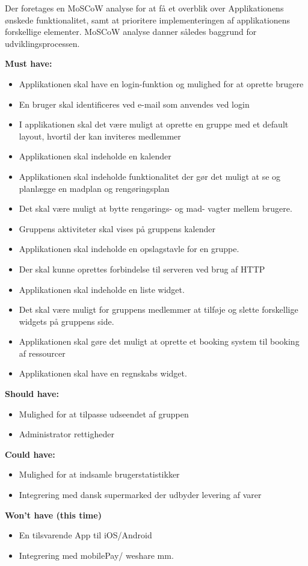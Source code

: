 Der foretages en MoSCoW analyse for at få et overblik over Applikationens ønskede funktionalitet, samt at prioritere implementeringen af applikationens forskellige elementer. MoSCoW analyse danner således baggrund for udviklingsprocessen.
\newline\newline

\noindent \textbf{Must have:}

\begin{itemize}
    \item Applikationen skal have en login-funktion og mulighed for at oprette brugere
    \item En bruger skal identificeres ved e-mail som anvendes ved login
    \item I applikationen skal det være muligt at oprette en gruppe med et default layout, hvortil der kan inviteres medlemmer
    \item Applikationen skal indeholde en kalender
    \item Applikationen skal indeholde funktionalitet der gør det muligt at se og planlægge en madplan og rengøringsplan
    \item Det skal være muligt at bytte rengørings- og mad- vagter mellem brugere. 
    \item Gruppens aktiviteter skal vises på gruppens kalender
    \item Applikationen skal indeholde en opslagstavle for en gruppe.
    \item Der skal kunne oprettes forbindelse til serveren ved brug af HTTP
    \item Applikationen skal indeholde en liste widget.
    \item Det skal være muligt for gruppens medlemmer at tilføje og slette forskellige widgets på gruppens side.
    \item Applikationen skal gøre det muligt at oprette et booking system til booking af ressourcer
    \item Applikationen skal have en regnskabs widget.
\end{itemize}

\noindent \textbf{Should have:}

\begin{itemize}
    \item Mulighed for at tilpasse udseendet af gruppen
    \item Administrator rettigheder
\end{itemize}

\noindent \textbf{Could have:}

\begin{itemize}
    \item Mulighed for at indsamle brugerstatistikker
    \item Integrering med dansk supermarked der udbyder levering af varer
\end{itemize}

\noindent \textbf{Won't have (this time)}
\begin{itemize}
    \item En tilsvarende App til iOS/Android
    \item Integrering med mobilePay/ weshare mm.
\end{itemize}

